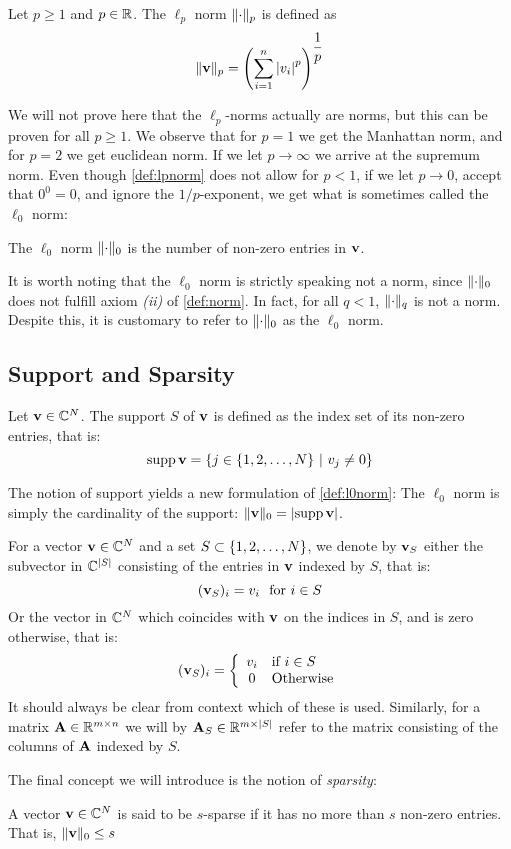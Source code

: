 \begin{definition} \label{def:lpnorm}
	Let $ p \geq 1 $ and $ p \in \mathbb{R} $. The $ \ell_{p} $ norm $ \lVert\cdot\rVert_{p} $ is defined as
	\[
		\lVert\mathbf{v}\rVert_{p} = \left( \sum_{i=1}^{n} \left|v_{i}\right|^{p} \right)^{\dfrac{1}{p}}
	\]
\end{definition}

We will not prove here that the $ \ell_{p} $-norms actually are norms, but this can be proven for all $ p\geq 1 $. We observe that for $ p=1 $ we get the Manhattan norm, and for $ p=2 $ we get euclidean norm. If we let $ p\to\infty $ we arrive at the supremum norm. Even though \cref{def:lpnorm} does not allow for $ p < 1 $, if we let $ p\to0 $, accept that $ 0^{0} = 0 $, and ignore the $ 1/p $-exponent, we get what is sometimes called the $ \ell_{0} $ norm:

\begin{definition} \label{def:l0norm}
	The $ \ell_{0} $ norm $ \lVert\cdot\rVert_{0} $ is the number of non-zero entries in $ \mathbf{v} $.
\end{definition}

It is worth noting that the $ \ell_{0} $ norm is strictly speaking not a norm, since $ \lVert\cdot\rVert_{0} $ does not fulfill axiom \textit{(ii)} of \cref{def:norm}. In fact, for all $ q<1 $, $ \lVert\cdot\rVert_{q} $ is not a norm. Despite this, it is customary to refer to $ \lVert\cdot\rVert_{0} $ as the $ \ell_{0} $ norm.

\subsection{Support and Sparsity}

\begin{definition} \label{def:support}
	Let $ \mathbf{v} \in \mathbb{C}^{N} $. The support $ S $ of $ \mathbf{v} $ is defined as the index set of its non-zero entries, that is:
	\[
		\operatorname{supp} \mathbf{v} = \{j \in \{1, 2, \ldots, N\} ~|~ v_{j} \neq 0\}
	\]
\end{definition}

The notion of support yields a new formulation of \cref{def:l0norm}: The $ \ell_{0} $ norm is simply the cardinality of the support: $ \lVert\mathbf{v}\rVert_{0} = \left|\operatorname{supp} \mathbf{v}\right| $.

For a vector $ \mathbf{v}\in\mathbb{C}^{N} $ and a set $ S \subset \{1, 2, \ldots, N\} $, we denote by $ \mathbf{v}_{S} $ either the subvector in $ \mathbb{C}^{\left|S\right|} $ consisting of the entries in $ \mathbf{v} $ indexed by $ S $, that is:
\begin{equation}
	\label{eq:vSalt1}
	(\mathbf{v}_{S})_{i} = v_{i} \text{~~for } i \in S
\end{equation}
Or the vector in $ \mathbb{C}^{N} $ which coincides with $ \mathbf{v} $ on the indices in $ S $, and is zero otherwise, that is:
\begin{equation}
	\label{eq:vSalt2}
	(\mathbf{v}_{S})_{i} = \left\{ \begin{array}{cl} v_{i} & \text{if } i \in S \\ 0 & \text{Otherwise} \end{array} \right.
\end{equation}
It should always be clear from context which of these is used. Similarly, for a matrix $ \mathbf{A}\in\mathbb{R}^{m \times n} $ we will by $ \mathbf{A}_{S} \in \mathbb{R}^{m \times \left|S\right|} $ refer to the matrix consisting of the columns of $ \mathbf{A} $ indexed by $ S $.

The final concept we will introduce is the notion of \textit{sparsity}:

\begin{definition} A vector $ \mathbf{v} \in \mathbb{C}^{N} $ is said to be $ s $-sparse if it has no more than $ s $ non-zero entries. That is, $ \lVert\mathbf{v}\rVert_{0} \leq s $
\end{definition}

